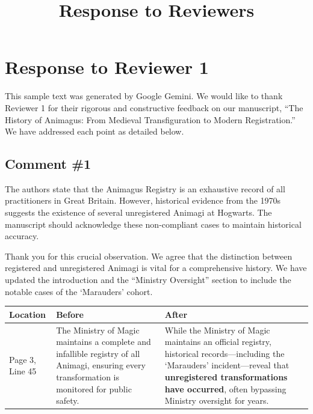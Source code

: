 \documentclass[
  letterpaper,
  DIV=11,
  numbers=noendperiod]{scrartcl}
\title{Response to Reviewers}
\author{}
\date{}
\begin{document}
\maketitle


\section{Response to Reviewer 1}\label{response-to-reviewer-1}

This sample text was generated by Google Gemini.
We would like to thank Reviewer 1 for their rigorous and constructive feedback on our manuscript, ``The History of Animagus: From Medieval Transfiguration to Modern Registration.''
We have addressed each point as detailed below.

\subsection{Comment \#1}\label{comment-1}

\begin{reviewerbox}

The authors state that the Animagus Registry is an exhaustive record of all practitioners in Great Britain. However, historical evidence from the 1970s suggests the existence of several unregistered Animagi at Hogwarts. The manuscript should acknowledge these non-compliant cases to maintain historical accuracy.

\end{reviewerbox}

Thank you for this crucial observation. We agree that the distinction between registered and unregistered Animagi is vital for a comprehensive history. We have updated the introduction and the ``Ministry Oversight'' section to include the notable cases of the `Marauders' cohort.

\begin{longtable*}{p{0.18\textwidth} p{0.36\textwidth} p{0.36\textwidth}}
\toprule
\textbf{Location} & \textbf{Before} & \textbf{After} \\
\midrule
\endhead
Page 3, Line 45 & The Ministry of Magic maintains a complete and infallible registry of
all Animagi, ensuring every transformation is monitored for public
safety. & While the Ministry of Magic maintains an official registry, historical
records---including the `Marauders' incident---reveal that
\textbf{unregistered transformations have occurred}, often bypassing
Ministry oversight for years. \\
\midrule
\end{longtable*}
\end{document}
